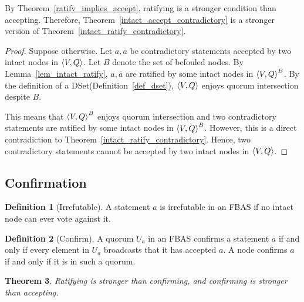 \documentclass[12pt, psamsfonts]{amsart}
\newtheorem{thm}{Theorem}[subsection]
\theoremstyle{definition}
\newtheorem{defn}[thm]{Definition}
\theoremstyle{remark}
\numberwithin{equation}{subsection}
\begin{document}
By Theorem~\ref{ratify_implies_accept}, ratifying is a stronger condition than accepting.
Therefore, Theorem~\ref{intact_accept_contradictory} is a stronger version of Theorem~\ref{intact_ratify_contradictory}.

\begin{proof}
    Suppose otherwise.
    Let $a, \bar{a}$ be contradictory statements accepted by two intact nodes in $\ev{V, Q}$.
    Let $B$ denote the set of befouled nodes.
    By Lemma~\ref{lem_intact_ratify}, $a, \bar{a}$ are ratified by some intact nodes in $\ev{V, Q}^B$.
    By the definition of a DSet(Definition~\ref{def_dset}), $\ev{V, Q}$ enjoys quorum intersection despite $B$.

    This means that $\ev{V, Q}^B$ enjoys quorum intersection and two contradictory statements are ratified by some intact nodes in $\ev{V, Q}^B$.
    However, this is a direct contradiction to Theorem~\ref{intact_ratify_contradictory}.
    Hence, two contradictory statements cannot be accepted by two intact nodes in $\ev{V, Q}$.
\end{proof}

\newpage
\subsection{Confirmation}

\begin{defn}[Irrefutable]\label{def_irrefutable}
    A statement $a$ is irrefutable in an FBAS if no intact node can ever vote against it.
\end{defn}


\begin{defn}[Confirm]\label{def_confirm}
    A quorum $U_a$ in an FBAS confirms a statement $a$ if and only if every element in $U_a$ broadcasts that it has accepted $a$.
    A node confirms $a$ if and only if it is in such a quorum.
\end{defn}

\begin{thm}\label{ratify_confirm_accept}
    Ratifying is stronger than confirming, and confirming is stronger than accepting.
\end{thm}
\end{document}
